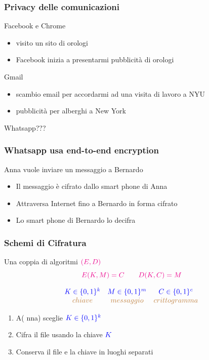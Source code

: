 \documentclass[]{beamer}
\begin{document}
\begin{frame}
\frametitle{Privacy delle comunicazioni}

\begin{block}{Facebook e Chrome}
\begin{itemize}
\item visito un sito di orologi
\item {\color{magenta} Facebook} inizia a presentarmi pubblicit\`a di orologi
\end{itemize}
\end{block}
\pause
\begin{block}{{\color{magenta} Gmail}}
\begin{itemize}
\item scambio email per accordarmi ad una visita di lavoro a {\color{brown} NYU}
\item pubblicit\`a per alberghi a {\color{brown} New York}
\end{itemize}
\end{block}
\pause

\vfill
\centerline{\alert{Whatsapp}???}
\end{frame}

\begin{frame}
\frametitle{Whatsapp usa end-to-end encryption}

{\color{brown} Anna vuole inviare un messaggio a Bernardo}

\begin{itemize}
\color{olive}
\item Il messaggio \`e cifrato dallo smart phone di Anna
\item Attraversa Internet fino a Bernardo in forma cifrato
\item Lo smart phone di Bernardo lo decifra
\end{itemize}

\pause

\vfill
\begin{center}
\color{brown}{Come \`e possibile?}
\end{center}
\end{frame}

\begin{frame}
\frametitle{Schemi di Cifratura}
Una coppia di algoritmi ${\color{magenta} (E,D)}$
$${\color{magenta} E(K,M)=C\qquad D(K,C)=M}$$

$$\begin{array}{ccc}
{\color{blue} K\in\{0,1\}^k} & 
{\color{blue} M\in\{0,1\}^m} & 
{\color{blue} C\in\{0,1\}^c} \\
{\color{brown} chiave} & 
{\color{brown} messaggio}& 
{\color{brown} crittogramma}
\end{array}
$$

\pause
\begin{enumerate}
\item {\color{magenta} A}({\color{green} nna}) sceglie ${\color{blue} K\in\{0,1\}^k}$
\item Cifra il file usando la chiave ${\color{blue} K}$
\item Conserva il file e la chiave in luoghi separati
\end{enumerate}
\end{frame}
\end{document}

